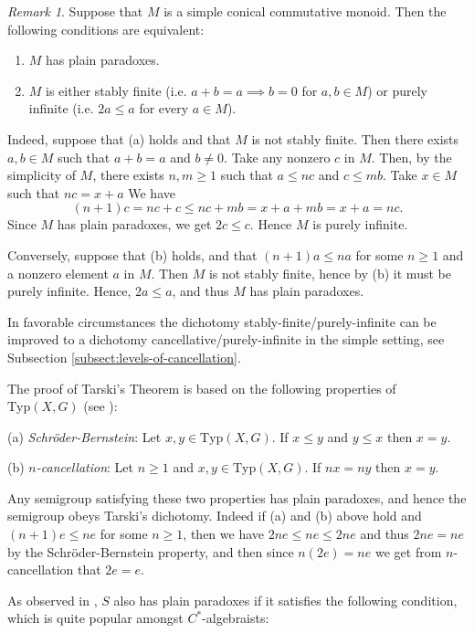 \documentclass[11pt]{amsart}
\theoremstyle{plain}            %
\theoremstyle{definition}       %
\theoremstyle{definition}       %
\theoremstyle{remark}
\newtheorem{remark}[theorem]{Remark}
\newcommand{\Typ}{\mathrm{Typ}}
\begin{document}
\begin{remark}
\label{rem:simple-dichotomy}
Suppose that $M$ is a simple conical commutative monoid. Then the following conditions are equivalent:
\begin{enumerate}
\item[(a)] $M$ has plain paradoxes.
\item[(b)] $M$ is either stably finite (i.e. $a+b= a \implies b=0$ for $a,b\in M$) or purely infinite (i.e. $2a\le a$ for every $a\in M$). 
\end{enumerate}
Indeed, suppose that (a) holds and that $M$ is not stably finite. Then there exists $a,b\in M$ such that $a+b=a$ and $b\ne 0$.
Take any nonzero $c$ in $M$. Then, by the simplicity of $M$, there exists $n,m\ge 1$ such that $a\le nc$ and $c\le mb$. Take $x\in M$ such that $nc= x+a$
We have
$$(n+1) c = nc+c \le nc + mb = x+a+mb = x+a= nc.$$
Since $M$ has plain paradoxes, we get $2c\le c$. Hence $M$ is purely infinite. 

Conversely, suppose that (b) holds, and that $(n+1) a \le na$ for some $n\ge 1$ and a nonzero element $a$ in $M$. Then $M$ is not stably finite, hence by (b) it must be purely infinite.
Hence, $2a\le a$, and thus $M$ has plain paradoxes. 
\end{remark}

In favorable circumstances the dichotomy stably-finite/purely-infinite can be improved to a dichotomy cancellative/purely-infinite in the simple setting, 
see Subsection \ref{subsect:levels-of-cancellation}.

The proof of Tarski's Theorem is based on the following properties
of $\Typ (X,G)$ (see \cite[Theorem 3.6 and Theorem 10.19]{TomWagon}):

\smallskip

(a) {\it Schr\" oder-Bernstein}: Let $x,y\in \Typ (X,G)$. If $x\le y$
and $y\le x$ then $x=y$.

\smallskip

(b) {\it $n$-cancellation}: Let $n\ge 1$ and $x,y\in \Typ (X,G)$. If
$nx=ny$ then $x=y$.

\smallskip

Any semigroup satisfying these two properties has plain paradoxes, and hence the 
semigroup obeys Tarski's dichotomy. Indeed if (a) and (b) above hold and $(n+1)e\le ne$
for some $n\ge 1$, then we have $2ne\le ne\le 2ne$ and thus $2ne= ne$ by the Schr\"oder-Bernstein property, and then since $n(2e) = ne$ we get from $n$-cancellation that $2e=e$.   

As observed in \cite[Theorem
5.4]{RorSie}, $S$ also has plain paradoxes if it satisfies the following
condition, which is quite popular amongst $C^*$-algebraists:
\end{document}
